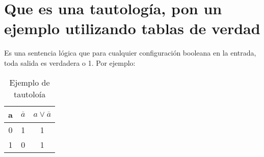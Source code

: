 \section{Que es una tautología, pon un ejemplo utilizando tablas de verdad}
Es una sentencia lógica que para cualquier configuración booleana en la entrada, toda salida es verdadera o 1. Por ejemplo:
\begin{table}[!ht]
    \centering
    \begin{tabular}{|c|c|c|}
        \hline
        a & $\overline{a}$ & $a \vee \overline{a}$ \\
        \hline
        0 & 1 & 1 \\
        \hline
        1 & 0 & 1 \\
        \hline
    \end{tabular}
    \caption{Ejemplo de tautoloía}\label{table:tautologia}
\end{table}